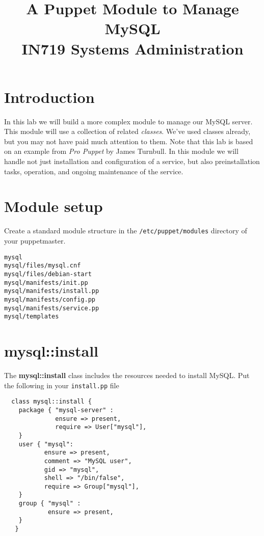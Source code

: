 \documentclass{article}   	%
\title{A Puppet Module to Manage MySQL \\ IN719 Systems Administration}
\date{}							%
\begin{document}
\maketitle

\section*{Introduction}
In this lab we will build a more complex module to manage our MySQL server.  This module will use a collection of related \emph{classes}.  We've used classes already, but you may not have paid much attention to them.  Note that this lab is based on an example from \emph{Pro Puppet} by James Turnbull.  In this module we will handle not just installation and configuration of a service, but also preinstallation tasks, operation, and ongoing maintenance of the service.
\section{Module setup}
Create a standard module structure in the \texttt{/etc/puppet/modules} directory of your puppetmaster.

\texttt{mysql} \\
\texttt{mysql/files/mysql.cnf} \\
\texttt{mysql/files/debian-start} \\
\texttt{mysql/manifests/init.pp} \\
\texttt{mysql/manifests/install.pp} \\
\texttt{mysql/manifests/config.pp} \\
\texttt{mysql/manifests/service.pp} \\
\texttt{mysql/templates} \\



\section{mysql::install}
The \textbf{mysql::install} class includes the resources needed to install MySQL.  Put the following in your \texttt{install.pp} file

\begin{verbatim}
  class mysql::install {
    package { "mysql-server" :
              ensure => present,
              require => User["mysql"],
    }
    user { "mysql":
           ensure => present,
           comment => "MySQL user",
           gid => "mysql",
           shell => "/bin/false",
           require => Group["mysql"],
    }
    group { "mysql" :
            ensure => present,
    }
   }

\end{verbatim}
\end{document}
